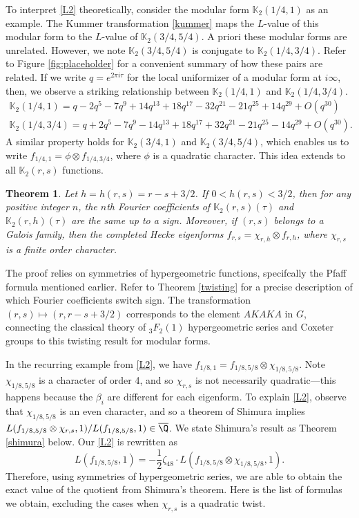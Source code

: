 \documentclass[12pt]{amsart}
\renewcommand{\bar}{\overline}
\newtheorem{theorem}{Theorem}[section]
\theoremstyle{definition}
\theoremstyle{remark}
\begin{document}
To interpret \eqref{L2} theoretically, consider the modular form $\mathbb{K}_2(1/4,1)$ as an example. The Kummer transformation \eqref{kummer} maps the $L$-value of this modular form to the $L$-value of $\mathbb{K}_2(3/4,5/4)$. A priori these modular forms are unrelated. However, we note $\mathbb{K}_2(3/4,5/4)$ is conjugate to $\mathbb{K}_2(1/4,3/4)$. Refer to Figure \ref{fig:placeholder} for a convenient summary of how these pairs are related. If we write $q=e^{2\pi i\tau}$ for the local uniformizer of a modular form at $i\infty$, then, we observe a striking relationship between  $\mathbb{K}_2(1/4,1)$ and $\mathbb{K}_2(1/4,3/4)$. \begin{align*}
     \mathbb{K}_2(1/4,1)=q - 2 q^5 - 7 q^9 + 14 q^{13} + 18 q^{17} - 32 q^{21} - 21 q^{25} + 14 q^{29}+O(q^{30})\\
    \mathbb{K}_2 (1/4,3/4)=q + 2 q^5 - 7 q^9 - 14 q^{13} + 18 q^{17} + 32 q^{21} - 21 q^{25} - 14 q^{29}+O(q^{30}).
 \end{align*}  A similar property holds for $\mathbb{K}_2(3/4,1)$ and $\mathbb{K}_2(3/4,5/4)$, which enables us to write $f_{1/4,1}=\phi\otimes f_{1/4,3/4}$, where $\phi$ is a quadratic character. This idea extends to all $\mathbb{K}_2(r,s)$ functions.
\begin{theorem}\label{twistingpre}
    Let $h=h(r,s)=r-s +3/2$. If $0<h(r,s)<3/2$, then for any positive integer $n$, the $n$th Fourier coefficients of $\mathbb{K}_2(r,s)(\tau)$ and $\mathbb{K}_2(r,h)(\tau)$ are the same up to a sign. Moreover, if $(r,s)$ belongs to a Galois family, then the completed Hecke eigenforms $f_{r,s}=\chi_{r,h}\otimes f_{r,h}$, where $\chi_{r,s}$ is a finite order character.
\end{theorem}
The proof relies on symmetries of hypergeometric functions, specifcally the Pfaff formula mentioned earlier. Refer to Theorem \ref{twisting} for a precise description of which Fourier coefficients switch sign. The transformation $(r,s)\mapsto (r,r-s+3/2)$ corresponds to the element $AKAKA$ in $G$, connecting the classical theory of ${}_3F_2(1)$ hypergeometric series and Coxeter groups to this twisting result for modular forms.

In the recurring example from \eqref{L2}, we have  $f_{1/8,1}=f_{1/8,5/8}\otimes \chi_{1/8,5/8}$. Note $\chi_{1/8,5/8}$ is a character of order 4, and so $\chi_{r,s}$ is not necessarily quadratic---this happens because the $\beta_i$ are different for each eigenform.
 To explain \eqref{L2}, observe that $\chi_{1/8,5/8}$ is an even character, and so a theorem of Shimura \cite{shimurazeta} implies $L(f_{1/8,5/8}\otimes\chi_{r,s},1)/L(f_{1/8,5/8},1)\in \bar{\Q}$. We state Shimura's result as Theorem \ref{shimura} below.  Our \eqref{L2} is rewritten  as \begin{equation}\label{L}
    L(f_{1/8,5/8},1)=-\frac{1}{2}\zeta_{48}\cdot L(f_{1/8,5/8}\otimes\chi_{1/8,5/8},1). 
\end{equation}  Therefore, using symmetries of hypergeometric series, we are able to obtain the exact value of the quotient from Shimura's theorem. Here is the list of formulas we obtain, excluding the cases when $\chi_{r,s}$ is a quadratic twist.
\end{document}
